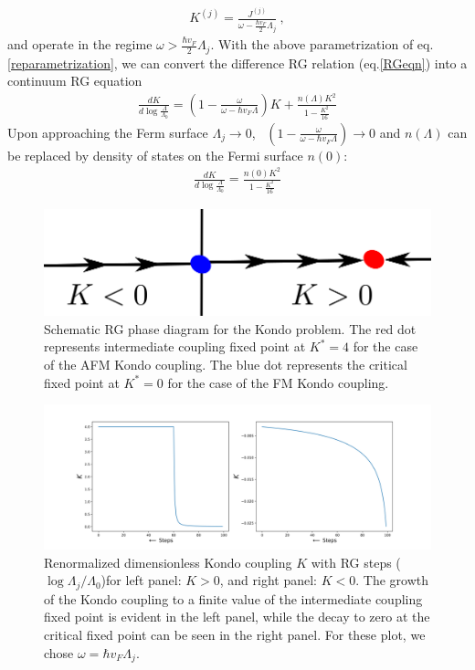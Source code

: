 \documentclass[aps,prb,preprint,groupedaddress]{revtex4-2}
\begin{document}
\begin{eqnarray}
K^{(j)}=\frac{J^{(j)}}{\omega-\frac{\hbar v_{F}}{2}\Lambda_{j}}~,\label{reparametrization}
\end{eqnarray} 
and operate in the regime $\omega>\frac{\hbar v_{F}}{2}\Lambda_{j}$. 
With the above parametrization of eq.\eqref{reparametrization}, we can convert the difference RG relation (eq.\eqref{RGeqn}) into a continuum RG equation
\begin{eqnarray}
\frac{d K}{d\log\frac{\Lambda}{\Lambda_{0}}}=\left(1-\frac{\omega}{\omega-\hbar v_{F}\Lambda}\right)K+\frac{n(\Lambda)K^{2}}{1-\frac{K^{2}}{16}}
\end{eqnarray}
Upon approaching the Ferm surface $\Lambda_{j}\to 0$,~ $\left(1-\frac{\omega}{\omega-\hbar v_{F}\Lambda}\right)\to 0$ and $n(\Lambda)$ can be replaced by density of states on the Fermi surface $n(0)$:
\begin{eqnarray}
\frac{d K}{d\log\frac{\Lambda}{\Lambda_{0}}}=\frac{n(0)K^{2}}{1-\frac{K^{2}}{16}}
\end{eqnarray}
\begin{figure}[h!]
\centering
\includegraphics[scale=0.6]{Kondo.png}
\caption{Schematic RG phase diagram for the Kondo problem. The red dot represents intermediate coupling fixed point at $K^{*}=4$ for the case of the AFM Kondo coupling. The blue dot represents the critical fixed point at $K^{*}=0$ for the case of the FM Kondo coupling.} 
\end{figure}
\begin{figure}
\centering
\includegraphics[width=\textwidth]{RG_Flow.png}
\caption{Renormalized dimensionless Kondo coupling $K$ with RG steps ($\log\Lambda_{j}/\Lambda_{0}$)for left panel: $K>0$, and right panel: $K<0$. The growth of the Kondo coupling to a finite value of the intermediate coupling fixed point is evident in the left panel, while the decay to zero at the critical fixed point can be seen in the right panel. For these plot, we chose $\omega=\hbar v_{F}\Lambda_{j}$.} \label{Kondocoupling}
\end{figure}
\end{document}
